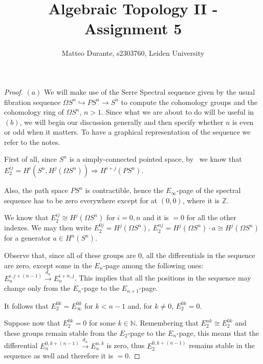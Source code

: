 \documentclass{article}
\newcommand{\numberset}{\mathbb}
\newcommand{\N}{\numberset{N}}
\newcommand{\Z}{\numberset{Z}}
\newcommand{\exercise}[1]{\noindent {\bf Exercise #1}}
\begin{document}
\title{Algebraic Topology II - Assignment 5}

\author{Matteo Durante, s2303760, Leiden University}

\maketitle

\exercise{2}

\begin{proof}
    $(a)$ We will make use of the Serre Spectral sequence given by the usual
    fibration sequence $\Omega S^n\hookrightarrow PS^n\rightarrow S^n$ to
    compute the cohomology groups and the cohomology ring of $\Omega S^n$,
    $n>1$. Since what we are about to do will be useful in $(b)$, we will begin
    our discussion generally and then specify whether $n$ is even or odd when it
    matters. To have a graphical representation of the sequence we refer to the
    notes.

    First of all, since $S^n$ is a simply-connected pointed space, by~\cite[thm.
    9.5]{HM19} we know that $E^{ij}_2=H^i(S^n,H^j(\Omega S^n))\Rightarrow
    H^{i+j}(PS^n)$.

    Also, the path space $PS^n$ is contractible, hence the $E_\infty$-page of
    the spectral sequence has to be zero everywhere except for at $(0,0)$, where
    it is $\Z$.

    We know that $E^{ij}_2\cong H^j(\Omega S^n)$ for $i=0,n$ and it is $=0$ for
    all the other indexes. We
    may then write $E_2^{0j}=H^j(\Omega S^n),\ E_2^{nj}=H^j(\Omega S^n)\cdot
    a\cong H^j(\Omega S^n)$ for a generator $a\in H^n(S^n)$.

    Observe that, since all of these groups are 0, all the differentials in the
    sequence are zero, except some in the $E_n$-page among the following ones:
    $E^{i,j+(n-1)}_n\xrightarrow{d_n}E^{i+n,j}_n$. This implies that all the
    positions in the sequence may change only from the $E_n$-page to the
    $E_{n+1}$-page.

    It follows that $E^{0k}_2=E^{0k}_\infty$ for $k<n-1$ and, for $k\neq 0$,
    $E^{0k}_2=0$.

    Suppose now that $E^{0k}_2=0$ for some $k\in\N$. Remembering that
    $E^{nk}_2\cong E^{0k}_2$ and these groups remain stable from the
    $E_2$-page to the $E_n$-page, this means that the differential
    $E^{0,k+(n-1)}_n\xrightarrow{d_n} E^{n,k}_n$ is zero, thus $E^{0,k+(n-1)}_2$
    remains stable in the sequence as well and therefore it is $=0$.


\end{proof}
\end{document}
